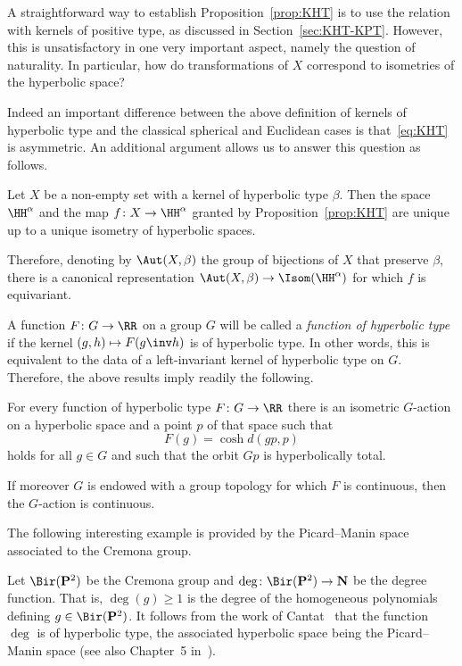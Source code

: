 A straightforward way to establish Proposition~\ref{prop:KHT} is to use the relation with kernels of positive type, as discussed in Section~\ref{sec:KHT-KPT}. However, this is unsatisfactory in one very important aspect, namely the question of naturality. In particular, how do transformations of $X$ correspond to isometries of the hyperbolic space?

Indeed an important difference between the above definition of kernels of hyperbolic type and the classical spherical and Euclidean cases is that~\eqref{eq:KHT} is asymmetric. An additional argument allows us to answer this question as follows.

\begin{theorem}\label{thm:KHT-char}
Let $X$ be a non-empty set with a kernel of hyperbolic type $\beta$. Then the space $\HH^\alpha$ and the map $f\colon X\to \HH^\alpha$ granted by Proposition~\ref{prop:KHT} are unique up to a unique isometry of hyperbolic spaces.

Therefore, denoting by $\Aut(X,\beta)$ the group of bijections of $X$ that preserve $\beta$, there is a canonical representation $\Aut(X,\beta) \to \Isom(\HH^\alpha)$ for which $f$ is equivariant.
\end{theorem}

A function $F\colon G \to \RR$ on a group $G$ will be called a \emph{function of hyperbolic type} if the kernel $(g,h)\mapsto F(g\inv h)$ is of hyperbolic type. In other words, this is equivalent to the data of a left-invariant kernel of hyperbolic type on $G$. Therefore, the above results imply readily the following.

\begin{coro}\label{cor:KHT-group}
For every function of hyperbolic type $F\colon G \to \RR$ there is an isometric $G$-action on a hyperbolic space and a point $p$ of that space such that
\[
F(g) = \cosh d(gp, p)
\]
holds for all $g\in G$ and such that the orbit $G p$ is hyperbolically total.

If moreover $G$ is endowed with a group topology for which $F$ is continuous, then the $G$-action is continuous.
\end{coro}

The following interesting example is provided by the Picard--Manin space associated to the Cremona group.

\begin{exam}\label{ex:PM}
Let $\Bir(\mathbf{P}^{2})$ be the Cremona group and $\deg \colon \Bir(\mathbf{P}^{2}) \to \mathbf{N}$ be the degree function. That is, $\deg(g)\geq 1$ is the degree of the homogeneous polynomials defining $g\in \Bir(\mathbf{P}^{2})$. It follows from the work of Cantat~\cite{Cantat} that the function $\deg$ is of hyperbolic type, the associated hyperbolic space being the Picard--Manin space (see also Chapter~5 in~\cite{Manin}).
\end{exam}


